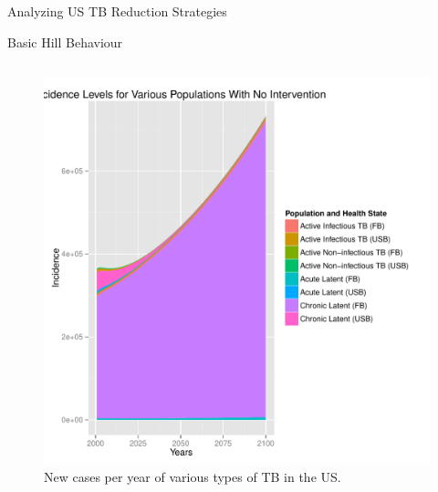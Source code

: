 \documentclass[final]{beamer}
\begin{document}
\begin{frame}
\begin{columns}
\begin{column}{.3\textwidth}
\begin{block}{Analyzing US TB Reduction Strategies}
\begin{block}{Basic Hill Behaviour}
\begin{column}{.45\textwidth}
            \begin{figure}[h]
              \begin{center}
                \includegraphics[scale=1]{incPlotTotal}
              \end{center}
              \caption{New cases per year of various types of TB in the US.}
              \label{fig:incPlotTotal}
            \end{figure}
          \end{column}
        \end{block}
        \begin{figure}[h]
          \begin{center}

\end{center}
\end{figure}
\end{block}
\end{column}
\end{columns}
\end{frame}
\end{document}
